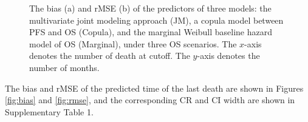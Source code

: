 \begin{figure}[t]
\centering
{}
\caption{The bias (a) and rMSE (b) of the predictors of three models: the multivariate joint modeling approach (JM), a copula model between PFS and OS (Copula), and the marginal Weibull baseline hazard model of OS (Marginal), under three OS scenarios. The $x$-axis denotes the number of death at cutoff. The $y$-axis denotes the number of months. \label{fig:result}}
\end{figure}

The bias and \ac{rMSE} of the predicted time of the last death are shown in Figures \ref{fig:bias} and \ref{fig:rmse}, and the corresponding \ac{CR} and \ac{CI} width are shown in Supplementary Table 1. 

